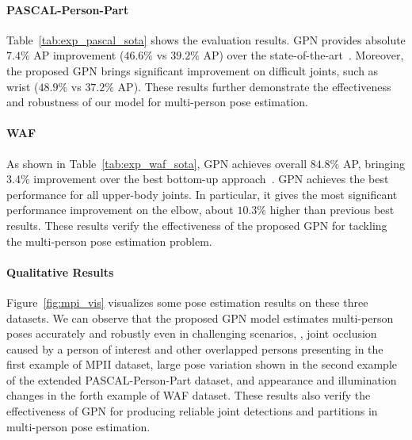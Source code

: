 \documentclass[10pt,twocolumn,letterpaper]{article}
\begin{document}
\vspace{-4mm}
\paragraph{PASCAL-Person-Part} Table~\ref{tab:exp_pascal_sota} shows the evaluation results. GPN provides absolute $7.4\%$ AP improvement ($46.6\%$ vs $39.2\%$ AP) over the state-of-the-art~\cite{xia2017joint}. Moreover, the proposed GPN brings significant improvement on difficult joints, such as wrist  ($48.9\%$ vs $37.2\%$ AP). These results further demonstrate the effectiveness and robustness of our model for multi-person pose estimation.

\vspace{-4mm}
\paragraph{WAF} As shown in Table~\ref{tab:exp_waf_sota}, GPN  achieves overall $84.8\%$ AP, bringing  $3.4\%$ improvement over the best bottom-up approach~\cite{hpe:deepercut_eccv16}. GPN achieves the best performance for all upper-body joints. In particular, it gives the most significant performance  improvement on the elbow, about $10.3\%$ higher than previous best results. These results  verify the effectiveness of the proposed GPN for tackling the multi-person pose estimation problem.


\vspace{-4mm}
\paragraph{Qualitative Results} Figure~\ref{fig:mpi_vis} visualizes some pose estimation results on these three datasets. We can observe that the proposed GPN model estimates multi-person poses accurately and robustly even in challenging scenarios, \eg, joint occlusion caused by a person of interest and other overlapped persons presenting in the first example of MPII dataset, large pose variation shown in the second example of the extended PASCAL-Person-Part dataset, and appearance and illumination changes in the forth example of WAF dataset. These results also verify the effectiveness of GPN for producing reliable joint detections and partitions in multi-person pose estimation. 
\end{document}
